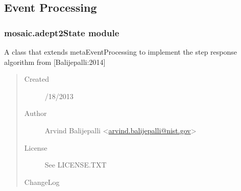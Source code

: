 \documentclass[letterpaper,10pt,english]{sphinxmanual}
\begin{document}
\subsection{Event Processing}
\label{api-doc/mosaic.processing:event-processing}\label{api-doc/mosaic.processing::doc}

\subsubsection{mosaic.adept2State module}
\label{api-doc/mosaic.processing:mosaic-adept2state-module}\label{api-doc/mosaic.processing:module-mosaic.adept2State}
A class that extends metaEventProcessing to implement the step response algorithm from {[}Balijepalli:2014{]}
\begin{quote}\begin{description}
\item[{Created}] /18/2013

\item[{Author}] \leavevmode
Arvind Balijepalli \textless{}\href{mailto:arvind.balijepalli@nist.gov}{arvind.balijepalli@nist.gov}\textgreater{}

\item[{License}] \leavevmode
See LICENSE.TXT

\item[{ChangeLog}] \leavevmode
\end{description}\end{quote}
\end{document}
